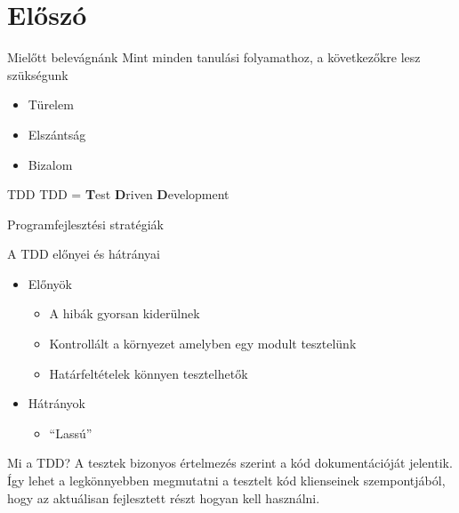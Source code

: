 \section{Előszó}

\begin{frame}{Mielőtt belevágnánk}
  Mint minden tanulási folyamathoz, a következőkre lesz szükségunk
  \begin{itemize}[<+->]
  \item Türelem
  \item Elszántság
  \item Bizalom
  \end{itemize}
\end{frame}

\begin{frame}{TDD}
  TDD = \textbf{T}est \textbf{D}riven \textbf{D}evelopment
\end{frame}

\begin{frame}{Programfejlesztési stratégiák}

\end{frame}

\begin{frame}{A TDD előnyei és hátrányai}
  \begin{itemize}[<+->]
  \item Előnyök
    \begin{itemize}
    \item A hibák gyorsan kiderülnek
    \item Kontrollált a környezet amelyben egy modult tesztelünk
    \item Határfeltételek könnyen tesztelhetők
    \end{itemize}
  \item Hátrányok
    \begin{itemize}
    \item ``Lassú''
    \end{itemize}
  \end{itemize}
\end{frame}

\begin{frame}{Mi a TDD?}
  A tesztek bizonyos értelmezés szerint a kód dokumentációját
  jelentik. Így lehet a legkönnyebben megmutatni a tesztelt kód
  klienseinek szempontjából, hogy az aktuálisan fejlesztett részt
  hogyan kell használni.
\end{frame}

